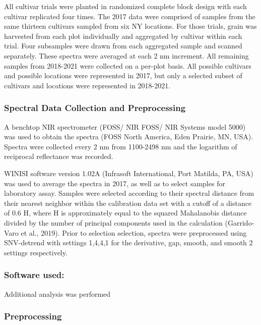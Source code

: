\documentclass[
]{agujournal2019}
\begin{document}
All cultivar trials were planted in randomized complete block design
with each cultivar replicated four times. The 2017 data were comprised
of samples from the same thirteen cultivars sampled from six NY
locations. For those trials, grain was harvested from each plot
individually and aggregated by cultivar within each trial. Four
subsamples were drawn from each aggregated sample and scanned
separately. These spectra were averaged at each 2 nm increment. All
remaining samples from 2018-2021 were collected on a per-plot basis. All
possible cultivars and possible locations were represented in 2017, but
only a selected subset of cultivars and locations were represented in
2018-2021.

\subsubsection{Spectral Data Collection and
Preprocessing}\label{spectral-data-collection-and-preprocessing}

A benchtop NIR spectrometer (FOSS/ NIR FOSS/ NIR Systems model 5000) was
used to obtain the spectra (FOSS North America, Eden Prairie, MN, USA).
Spectra were collected every 2 nm from 1100-2498 nm and the logarithm of
reciprocal reflectance was recorded.

WINISI software version 1.02A (Infrasoft International, Port Matilda,
PA, USA) was used to average the spectra in 2017, as well as to select
samples for laboratory assay. Samples were selected according to their
spectral distance from their nearest neighbor within the calibration
data set with a cutoff of a distance of 0.6 H, where H is approximately
equal to the squared Mahalanobis distance divided by the number of
principal components used in the calculation (Garrido-Varo et al.,
2019). Prior to selection selection, spectra were preprocessed using
SNV-detrend with settings 1,4,4,1 for the derivative, gap, smooth, and
smooth 2 settings respectively.

\subsubsection{Software used:}\label{software-used}

Additional analysis was performed

\subsubsection{Preprocessing}\label{preprocessing}
\end{document}
